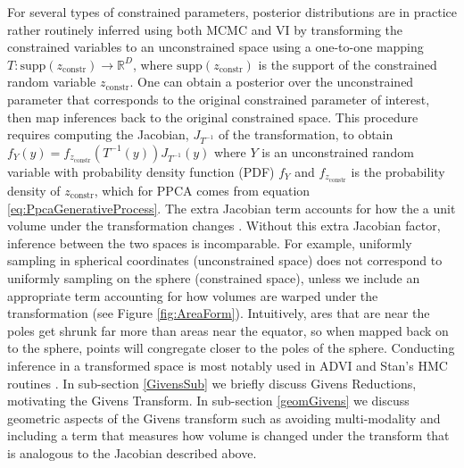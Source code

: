 \documentclass{article}
\begin{document}
For several types of constrained parameters, posterior distributions are in practice rather routinely inferred using both MCMC and VI by transforming the constrained variables to an unconstrained space using a one-to-one mapping $T: \mathrm{supp}(z_\mathrm{constr}) \to \mathbb{R}^D$, where $\mathrm{supp}(z_\mathrm{constr})$ is the support of the constrained random variable $z_\mathrm{constr}$. One can obtain a posterior over the unconstrained parameter that corresponds to the original constrained parameter of interest, then map inferences back to the original constrained space. This procedure requires computing the Jacobian, $J_{T^{-1}}$ of the transformation, to obtain $f_{Y}(y) = f_{z_\mathrm{constr}}(T^{-1}(y)) J_{T^{-1}}(y)$ where $Y$ is an unconstrained random variable with probability density function (PDF) $f_Y$ and $f_{z_\mathrm{constr}}$ is the probability density of $z_\mathrm{constr}$, which for PPCA comes from equation \ref{eq:PpcaGenerativeProcess}. The extra Jacobian term accounts for how the a unit volume under the transformation changes \citep{kucukelbir2014fully}. Without this extra Jacobian factor, inference between the two spaces is incomparable. For example, uniformly sampling in spherical coordinates (unconstrained space) does not correspond to uniformly sampling on the sphere (constrained space), unless we include an appropriate term accounting for how volumes are warped under the transformation (see Figure \ref{fig:AreaForm}). Intuitively, ares that are near the poles get shrunk far more than areas near the equator, so when mapped back on to the sphere, points will congregate closer to the poles of the sphere. Conducting inference in a transformed space is most notably used in ADVI and Stan's HMC routines \citep{carpenter2016stan, kucukelbir2014fully}. In sub-section \ref{GivensSub} we briefly discuss Givens Reductions, motivating the Givens Transform. In sub-section \ref{geomGivens} we discuss geometric aspects of the Givens transform such as avoiding multi-modality and including a term that measures how volume is changed under the transform that is analogous to the Jacobian described above.

\end{document}
